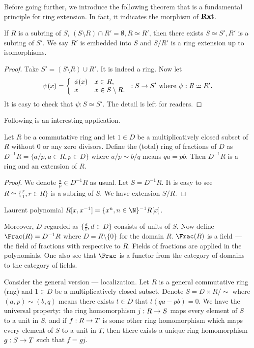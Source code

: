 \documentclass[11pt,a4paper,fleqn]{article}
\begin{document}
Before going further, we introduce the following theorem that is a fundamental principle for ring extension. In fact, it indicates the morphism of ${\textbf{Rxt}}$.
\begin{theorem}\label{th:embed}
If $R$ is a subring of $S$, $(S \setminus R)\cap R'=\emptyset,R\simeq R'$, then there exists $S\simeq S',R'$ is a subring of $S'$. We say $R'$ is embedded into $S$ and $S/R'$ is a ring extension up to isomorphisms.
\end{theorem}
\begin{proof}
Take $S'=(S \setminus R)\cup R'$. It is indeed a ring. Now let
\[\psi(x)=\left\{\begin{array}{ll}
                                            \phi(x) & x\in R, \\
                                            x & x\in S\setminus R.
                                          \end{array}\right.:S\map S'$ where $\psi:R\simeq R'.\]
It is easy to check that $\psi:S\simeq S'$. The detail is left for readers.
\end{proof}

Following is an interesting application.
\begin{corollary}
Let $R$ be a commutative ring and let $1\in D$ be a multiplicatively closed subset of $R$ without $0$ or any zero divisors. Define the (total) ring of fractions of $D$ as $D^{-1}R=\{a/p,a\in R,p\in D\}$ where $a/p\sim b/q$ means $qa=pb$. Then $D^{-1}R$ is a ring and an extension of $R$.
\end{corollary}
\begin{proof}We denote $\frac{a}{p}\in D^{-1}R$ as usual.
 Let $S=D^{-1}R$. It is easy to see $R\simeq\{\frac{r}{1},r\in R\}$ is a subring of $S$. We have extension $S/R$.
\end{proof}

\begin{example}
 Laurent polynomial $R[x,x^{-1}]=\{x^n, n\in\N\}^{-1}R[x]$.
\end{example}

Moreover, $D$ regarded as $\{\frac{d}{1},d\in D\}$ consists of units of $S$. Now define $\Frac(R)=D^{-1}R$ where $D=R\setminus\{0\}$ for the domain $R$. $\Frac(R)$ is a field --- the field of fractions with respective to $R$. Fields of fractions are applied in the polynomials. One also see that $\Frac$ is a functor from the category of domains to the category of fields.

\begin{remark}
Consider the general version --- localization. Let $R$ is a general commutative ring (rng) and $1\in D$ be a multiplicatively closed subset. Denote $S=D\times R/\sim$ where $(a,p)\sim(b,q)$ means there exists $t\in D$ that $t(qa-pb)=0$. We have the universal property: the ring homomorphism $j : R \rightarrow S$ maps every element of $S$ to a unit in $S$, and if $f : R \rightarrow T$ is some other ring homomorphism which maps every element of $S$ to a unit in $T$, then there exists a unique ring homomorphism $g : S \rightarrow T$ such that $f = g j$.
\end{remark}
\end{document}
